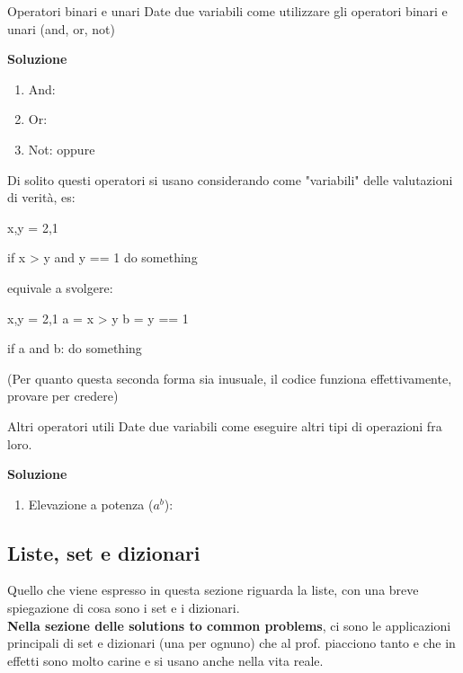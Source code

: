\documentclass[10pt]{article}
\makeatletter
\newcommand{\<}{\langle}
\renewcommand{\>}{\rangle}
\renewenvironment{proof}[1][\proofname] {\par\pushQED{\qed}
\renewcommand*{\proofname}{Soluzione}
{\normalfont\sffamily\bfseries\topsep6\p@\@plus6\p@\relax #1\@addpunct{.} }}{\popQED\endtrivlist\@endpefalse}
\theoremstyle{mystyle}{\newtheorem*{remark}{Nota}}
\theoremstyle{mystyle}{\newtheorem*{remarks}{Note}}
\theoremstyle{mystyle}{\newtheorem*{example}{Esempio}}
\theoremstyle{mystyle}{\newtheorem*{examples}{Esempi}}
\theoremstyle{definition}{\newtheorem*{exercise}{Exercise}}
\theoremstyle{warn}
\makeatother
\begin{document}
\begin{definition}{Operatori binari e unari}{}
Date due variabili  come utilizzare gli operatori binari e unari (and, or, not)
\end{definition}
\begin{proof}
\begin{enumerate}
    \item And: 
    \item Or: 
    \item Not:  oppure 
\end{enumerate}
\end{proof}
\begin{remark}
Di solito questi operatori si usano considerando come "variabili" delle valutazioni di verità, es:
\begin{python}
x,y = 2,1

if x > y and y == 1
    do something
\end{python}
equivale a svolgere:
\begin{python}
x,y = 2,1
a = x > y
b = y == 1

if a and b:
    do something
\end{python}
(Per quanto questa seconda forma sia inusuale, il codice funziona effettivamente, provare per credere)
\end{remark}
\begin{definition}{Altri operatori utili}{}
Date due variabili  come eseguire altri tipi di operazioni fra loro.
\end{definition}
\begin{proof}
\begin{enumerate}
    \item Elevazione a potenza ($a^b$): 
\end{enumerate}
\end{proof}

\newpage
\subsection{Liste, set e dizionari}
Quello che viene espresso in questa sezione riguarda la liste, con una breve spiegazione di cosa sono i set e i dizionari.\\
\textbf{Nella sezione delle solutions to common problems}, ci sono le applicazioni principali di set e dizionari (una per ognuno) che al prof. piacciono tanto e che in effetti sono molto carine e si usano anche nella vita reale.
\end{document}
